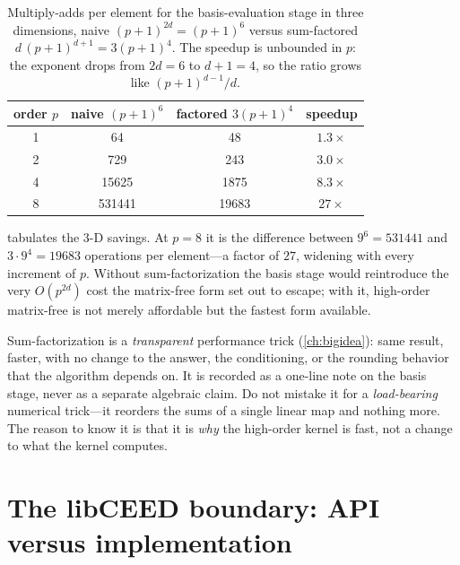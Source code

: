 \begin{table}[t]
\centering
\caption[Sum-factorization operation counts, $d=3$]{Multiply-adds per element for
the basis-evaluation stage in three dimensions, naive $(p+1)^{2d}=(p+1)^6$ versus
sum-factored $d\,(p+1)^{d+1}=3(p+1)^4$. The speedup is unbounded in $p$: the
exponent drops from $2d=6$ to $d+1=4$, so the ratio grows like $(p+1)^{d-1}/d$.}
\label{tab:appk-sumfac}
\small
\setlength{\tabcolsep}{9pt}
\renewcommand{\arraystretch}{1.2}
\begin{tabular}{@{}cccc@{}}
\toprule
order $p$ & naive $(p{+}1)^6$ & factored $3(p{+}1)^4$ & speedup \\
\midrule
1 & 64               & 48                & $1.3\times$ \\
2 & 729              & 243               & $3.0\times$ \\
4 & \num{15625}      & \num{1875}        & $8.3\times$ \\
8 & \num{531441}     & \num{19683}       & $27\times$ \\
\bottomrule
\end{tabular}
\end{table}

 tabulates the 3-D savings. At $p=8$ it is the difference
between $9^6=\num{531441}$ and $3\cdot 9^4=\num{19683}$ operations per element---a
factor of $27$, widening with every increment of $p$. Without sum-factorization the
basis stage would reintroduce the very $O(p^{2d})$ cost the matrix-free form set out
to escape; with it, high-order matrix-free is not merely affordable but the fastest
form available.

\begin{pitfall}
Sum-factorization is a \emph{transparent} performance trick (\cref{ch:bigidea}):
same result, faster, with no change to the answer, the conditioning, or the
rounding behavior that the algorithm depends on. It is recorded as a one-line note
on the basis stage, never as a separate algebraic claim. Do not mistake it for a
\emph{load-bearing} numerical trick---it reorders the sums of a single linear map
and nothing more. The reason to know it is that it is \emph{why} the high-order
kernel is fast, not a change to what the kernel computes.
\end{pitfall}

\section{The libCEED boundary: API versus implementation}
\label{sec:appk-extern}

